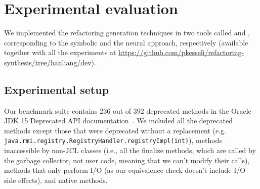 \documentclass[sigconf]{acmart}
\begin{document}



\section{Experimental evaluation}\label{sec:experimental-results}

We implemented the refactoring generation techniques in two tools called \tool and \llm, corresponding to the symbolic and the neural approach, respectively (available together with all the experiments at \url{https://github.com/pkesseli/refactoring-synthesis/tree/hanliang/dev}).

\subsection{Experimental setup}

Our benchmark suite contains 236 out of 392 deprecated methods in the Oracle
JDK 15 Deprecated API documentation~\cite{OracleJdk15DeprecatedAPI}.
We included all the deprecated methods except those that were deprecated without a replacement (e.g. \lstinline[breaklines=true]{java.rmi.registry.RegistryHandler.registryImpl(int)}),
methods inaccessible by non-JCL classes (i.e., all the finalize methods, which are called by the garbage collector, not user code, meaning that we can't modify their calls),
methods that only perform I/O (as our equivalence check doesn't include I/O side effects),
and native methods.
\end{document}
